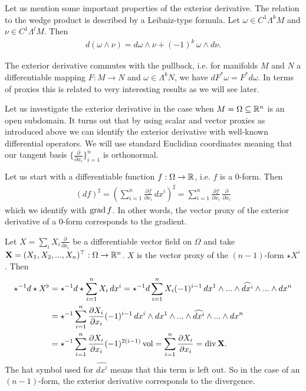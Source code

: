 \documentclass[../master_thesis.tex]{subfiles}
\begin{document}
Let us mention some important properties of the exterior derivative. 
The relation to the wedge product is described by a Leibniz-type formula. 
Let $\omega \in C^1 \Lambda^k M$ and $\nu \in C^1 \Lambda^l M$. Then
\begin{align}
    d (\omega \wedge \nu) = d\omega \wedge \nu + (-1)^k\, \omega \wedge d\nu.
    \label{eq:leibniz_formula}
\end{align}

The exterior derivative commutes with the pullback, i.e. 
for manifolds $M$ and $N$ a differentiable mapping $F:M \rightarrow N$ 
and $\omega \in \Lambda^k N$, we have $dF^* \omega = F^* d\omega$. 
In terms of proxies this is related to very interesting results as we will 
see later. 


Let us investigate the exterior derivative in the case when 
$M = \Omega \subseteq \mathbb{R}^n$ is an open subdomain. It turns out that by using 
scalar and vector proxies as introduced above we can identify the exterior 
derivative with well-known differential operators. We will use standard 
Euclidian coordinates meaning that our tangent basis $\{\frac{\partial}{\partial x_i}\}_{i=1}^n$
is orthonormal. 

Let us start with a differentiable function $f: \Omega \rightarrow \mathbb{R}$, i.e. 
$f$ is a $0$-form. Then
\begin{align*}
    (df)^\sharp = \left( \sum_{i=1}^n \frac{\partial f}{\partial x_i} \, dx^i 
        \right)^\sharp
    = \sum_{i=1}^n \frac{\partial f}{\partial x_i}\, \frac{\partial}{\partial x_i}
\end{align*}
which we identify with  $\operatorname{grad} f$. In other words, the vector proxy of the 
exterior derivative of a $0$-form corresponds to the gradient.

Let $X = \sum_i X_i \frac{\partial}{\partial x_i}$ be a differentiable vector field on $\Omega$ 
and take  $\mathbf{X} = (X_1,X_2, ..., X_n)^\top: \Omega \rightarrow \mathbb{R}^n$. 
$X$ is the vector proxy 
of the $(n-1)$-form $\star X^\flat$. Then 
\begin{align*}
    \star^{-1} d\star X^\flat &= \star^{-1} d\star \sum_{i=1}^n X_i \, dx^i
    = \star^{-1} d \sum_{i=1}^n X_i (-1)^{i-1} \,
        dx^1 \wedge ... \wedge \widehat{dx^i} 
        \wedge ... 
        \wedge dx^n
    \\ &= \star^{-1} \sum_{i=1}^n \frac{\partial X_i}{\partial x_i} (-1)^{i-1} 
        \, dx^i \wedge 
        dx^1 \wedge ... \wedge \widehat{dx^i} \wedge ... \wedge dx^n
    \\ &= \star^{-1} \sum_{i=1}^n \frac{\partial X_i}{\partial x_i} 
        (-1)^{2(i-1)} \operatorname{vol}
    = \sum_{i=1}^n \frac{\partial X_i}{\partial x_i}
    = \operatorname{div} \mathbf{X}.
\end{align*}
The hat symbol used for
$\widehat{dx^i}$ means that this term is left out. So in the case of an $(n-1)$-form,
the exterior derivative corresponds to the divergence.
\end{document}
